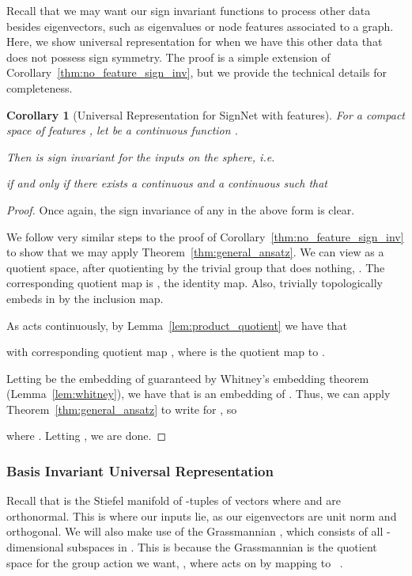 \documentclass{article} \usepackage{iclr2023_conference,times}
\newtheorem{corollary}{Corollary}
\begin{document}
Recall that we may want our sign invariant functions to process other data besides eigenvectors, such as eigenvalues or node features associated to a graph. Here, we show universal representation for when we have this other data that does not possess sign symmetry. The proof is a simple extension of Corollary~\ref{thm:no_feature_sign_inv}, but we provide the technical details for completeness.

\begin{corollary}[Universal Representation for SignNet with features]
    For a compact space of features , let  be a continuous function .

    Then  is sign invariant for the inputs on the sphere, i.e. 
    
if and only if there exists a continuous  and a continuous  such that
    
\end{corollary}
\begin{proof}
    Once again, the sign invariance of any  in the above form is clear.

    We follow very similar steps to the proof of Corollary~\ref{thm:no_feature_sign_inv} to show that we may apply Theorem~\ref{thm:general_ansatz}. We can view  as a quotient space, after quotienting by the trivial group that does nothing, . The corresponding quotient map is , the identity map. Also,  trivially topologically embeds in  by the inclusion map.

    As  acts continuously, by Lemma~\ref{lem:product_quotient} we have that
    
    with corresponding quotient map , where  is the quotient map to . 

    Letting  be the embedding of  guaranteed by Whitney's embedding theorem (Lemma~\ref{lem:whitney}), we have that  is an embedding of . Thus, we can apply Theorem~\ref{thm:general_ansatz} to write  for , so
    
    where . Letting , we are done.
\end{proof}


\subsubsection{Basis Invariant Universal Representation}

Recall that  is the Stiefel manifold of -tuples of vectors  where  and  are orthonormal. This is where our inputs lie, as our eigenvectors are unit norm and orthogonal. We will also make use of the Grassmannian , which consists of all -dimensional subspaces in . This is because the Grassmannian is the quotient space for the group action we want, , where  acts on  by mapping  to ~\citep{gallier2020differential}.
\end{document}
